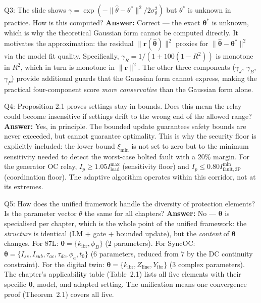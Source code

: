 \documentclass[12pt,a4paper]{article}
\newcommand{\kibr}{k_\mathrm{ibr}}
\newcommand{\thetahat}{\hat{\bm{\theta}}}
\newcommand{\thetastar}{\bm{\theta}^*}
\newcommand{\rvec}{\mathbf{r}}
\newcommand{\Ip}{I_p}
\begin{document}
\begin{keybox}{Q3: The slide shows $\gamma = \exp(-\|\hat\theta - \theta^*\|^2/2\sigma_\theta^2)$ but $\theta^*$ is unknown in practice. How is this computed?}
\textbf{Answer:}  Correct --- the exact $\thetastar$ is unknown, which is why the
theoretical Gaussian form cannot be computed directly.  It motivates the approximation:
the residual $\|\rvec(\thetahat)\|^2$ proxies for $\|\thetahat - \thetastar\|^2$ via
the model fit quality.  Specifically, $\gamma_R = 1/(1+100(1-R^2))$ is monotone in
$R^2$, which in turn is monotone in $\|\rvec\|^2$.  The other three components
($\gamma_J$, $\gamma_B$, $\gamma_P$) provide additional guards that the Gaussian
form cannot express, making the practical four-component score \emph{more conservative}
than the Gaussian form alone.
\end{keybox}

\begin{keybox}{Q4: Proposition 2.1 proves settings stay in bounds. Does this mean the relay could become insensitive if settings drift to the wrong end of the allowed range?}
\textbf{Answer:}  Yes, in principle.  The bounded update guarantees safety bounds are
never exceeded, but cannot guarantee optimality.  This is why the security floor is
explicitly included: the lower bound $\xi_\mathrm{min}$ is not set to zero but to
the minimum sensitivity needed to detect the worst-case bolted fault with a 20\% margin.
For the generator OC relay, $\Ip \geq 1.05 I_\mathrm{load}^\mathrm{max}$ (sensitivity
floor) and $\Ip \leq 0.80 I_\mathrm{fault,3P}^\mathrm{min}$ (coordination floor).  The
adaptive algorithm operates within this corridor, not at its extremes.
\end{keybox}

\begin{keybox}{Q5: How does the unified framework handle the diversity of protection elements? Is the parameter vector $\theta$ the same for all chapters?}
\textbf{Answer:}  No --- $\bm{\theta}$ is specialised per chapter, which is the whole
point of the unified framework: the \emph{structure} is identical (LM + gate + bounded
update), but the \emph{content} of $\bm{\theta}$ changes.  For 87L: $\bm{\theta} = \{\kibr, \phi_B\}$
(2 parameters).  For SyncOC: $\bm{\theta} = \{I_{ss}, I_{sub}, \tau_{ac}, \tau_{dc},
\phi_a, t_0\}$ (6 parameters, reduced from 7 by the DC continuity constraint).  For
the digital twin: $\bm{\theta} = \{\kibr, Z_\mathrm{line}, Y_\mathrm{ibr}\}$ (3 complex
parameters).  The chapter's applicability table (Table~2.1) lists all five elements
with their specific $\bm{\theta}$, model, and adapted setting.  The unification means
one convergence proof (Theorem~2.1) covers all five.
\end{keybox}
\end{document}
